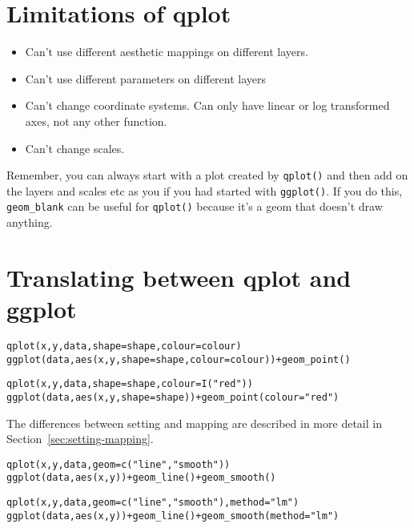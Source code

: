 \section{Limitations of qplot}
\label{sec:qplot-limitations}

\begin{itemize}
  \item Can't use different aesthetic mappings on different layers.  
  \item Can't use different parameters on different layers
  \item Can't change coordinate systems.  Can only have linear or log transformed axes, not any other function.
  \item Can't change scales.
\end{itemize}

Remember, you can always start with a plot created by {\tt qplot()} and then add on the layers and scales etc as you if you had started with {\tt ggplot()}.  If you do this, {\tt geom\_blank} can be useful for {\tt qplot()} because it's a geom that doesn't draw anything.

\section{Translating between qplot and ggplot}
\label{sec:translating}


\begin{alltt}
qplot(x, y, data, shape=shape, colour = colour)
ggplot(data, aes(x, y, shape=shape, colour = colour)) + geom_point()
\end{alltt}

\begin{alltt}
qplot(x, y, data, shape=shape, colour = I("red"))
ggplot(data, aes(x, y, shape=shape)) + geom_point(colour="red")
\end{alltt}

The differences between setting and mapping are described in more detail in Section~\ref{sec:setting-mapping}.

\begin{alltt}
qplot(x, y, data, geom=c("line", "smooth"))
ggplot(data, aes(x, y)) + geom_line() + geom_smooth()
\end{alltt}

\begin{alltt}
qplot(x, y, data, geom=c("line", "smooth"), method="lm")
ggplot(data, aes(x, y)) + geom_line() + geom_smooth(method="lm")
\end{alltt}


